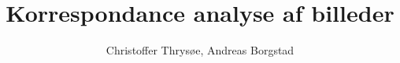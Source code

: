 \documentclass[11pt,a4paper,oldfontcommands,twosided,article]{memoir}
\title{Korrespondance analyse af billeder}
\author{Christoffer Thrysøe, Andreas Borgstad}
\date{} %
\begin{document}
\maketitle %
\newpage
\renewcommand{\contentsname}{Indholdsfortegnelse}
\setcounter{secnumdepth}{3}
\setcounter{tocdepth}{2}
\tableofcontents*
\newpage
{}
\raggedbottom
\newpage
\raggedbottom
\newpage
\raggedbottom
\newpage
\raggedbottom
\newpage%
\raggedbottom
\newpage%
\raggedbottom
\newpage
\raggedbottom
\newpage
\raggedbottom
\newpage

\nocite{}

\newpage
\appendix
\def\@chapapp{Appendix}

\end{document}
